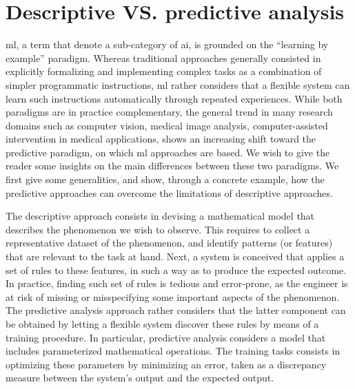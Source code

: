 \section{Descriptive VS. predictive analysis}
\Gls{ml}, a term that denote a sub-category of \gls{ai}, is grounded on the ``learning by example'' paradigm.
Whereas traditional approaches generally consisted in explicitly formalizing and implementing complex tasks as a combination of simpler programmatic instructions,
\gls{ml} rather considers that a flexible system can learn such instructions automatically through repeated experiences.
While both paradigms are in practice complementary, the general trend in many research domains such as computer vision, medical image analysis, computer-assisted intervention in medical applications, shows an increasing shift toward the predictive paradigm, on which \gls{ml} approaches are based.
We wish to give the reader some insights on the main differences between these two paradigms.
We first give some generalities, and show, through a concrete example, how the predictive approaches can overcome the limitations of descriptive approaches.

The descriptive approach consists in devising a mathematical model that describes the phenomenon we wish to observe.
This requires to collect a representative dataset of the phenomenon, and identify patterns (or features) that are relevant to the task at hand.
Next, a system is conceived that applies a set of rules to these features, in such a way as to produce the expected outcome.
In practice, finding such set of rules is tedious and error-prone, as the engineer is at risk of missing or misspecifying some important aspects of the phenomenon.
The predictive analysis approach rather considers that the latter component can be obtained by letting a flexible system discover these rules by means of a training procedure.
In particular, predictive analysis considers a model that includes parameterized mathematical operations. The training tasks consists in optimizing these parameters by minimizing an error, taken as a discrepancy measure between the system's output and the expected output.

